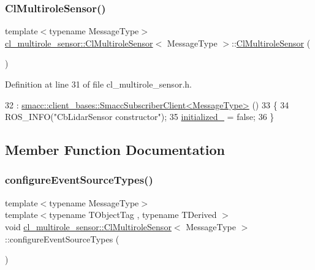 \subsubsection{\texorpdfstring{Cl\+Multirole\+Sensor()}{ClMultiroleSensor()}}
{\footnotesize\ttfamily template$<$typename Message\+Type$>$ \\
\hyperlink{classcl__multirole__sensor_1_1ClMultiroleSensor}{cl\+\_\+multirole\+\_\+sensor\+::\+Cl\+Multirole\+Sensor}$<$ Message\+Type $>$\+::\hyperlink{classcl__multirole__sensor_1_1ClMultiroleSensor}{Cl\+Multirole\+Sensor} (\begin{DoxyParamCaption}{ }\end{DoxyParamCaption})\hspace{0.3cm}{\ttfamily [inline]}}



Definition at line 31 of file cl\+\_\+multirole\+\_\+sensor.\+h.


\begin{DoxyCode}
32       : \hyperlink{classsmacc_1_1client__bases_1_1SmaccSubscriberClient}{smacc::client\_bases::SmaccSubscriberClient<MessageType>}
      ()
33   \{
34     ROS\_INFO(\textcolor{stringliteral}{"CbLidarSensor constructor"});
35     \hyperlink{classcl__multirole__sensor_1_1ClMultiroleSensor_a1f2bbfd7721308cb1eae4423d5fe999b}{initialized\_} = \textcolor{keyword}{false};
36   \}
\end{DoxyCode}


\subsection{Member Function Documentation}
\mbox{\label{classcl__multirole__sensor_1_1ClMultiroleSensor_a48474056b15f9cb24c5582bfbd228187}} 
\subsubsection{\texorpdfstring{configure\+Event\+Source\+Types()}{configureEventSourceTypes()}}
{\footnotesize\ttfamily template$<$typename Message\+Type$>$ \\
template$<$typename T\+Object\+Tag , typename T\+Derived $>$ \\
void \hyperlink{classcl__multirole__sensor_1_1ClMultiroleSensor}{cl\+\_\+multirole\+\_\+sensor\+::\+Cl\+Multirole\+Sensor}$<$ Message\+Type $>$\+::configure\+Event\+Source\+Types (\begin{DoxyParamCaption}{ }\end{DoxyParamCaption})\hspace{0.3cm}{\ttfamily [inline]}}



